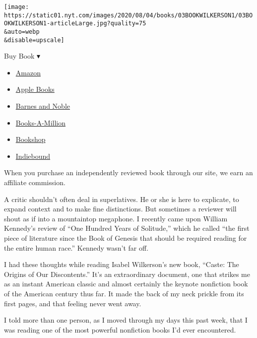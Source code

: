 \texttt{[image: https://static01.nyt.com/images/2020/08/04/books/03BOOKWILKERSON1/03BOOKWILKERSON1-articleLarge.jpg?quality=75\\\&auto=webp\\\&disable=upscale]}

Buy Book ▾

\begin{itemize}
\tightlist
\item
  \href{https://www.amazon.com/gp/search?index=books\&tag=NYTBSREV-20\&field-keywords=Caste+Isabel+Wilkerson}{Amazon}
\item
  \href{https://du-gae-books-dot-nyt-du-prd.appspot.com/buy?title=Caste\&author=Isabel+Wilkerson}{Apple
  Books}
\item
  \href{https://www.anrdoezrs.net/click-7990613-11819508?url=https\%3A\%2F\%2Fwww.barnesandnoble.com\%2Fw\%2F\%3Fean\%3D9780593230251}{Barnes
  and Noble}
\item
  \href{https://www.anrdoezrs.net/click-7990613-35140?url=https\%3A\%2F\%2Fwww.booksamillion.com\%2Fp\%2FCaste\%2FIsabel\%2BWilkerson\%2F9780593230251}{Books-A-Million}
\item
  \href{https://bookshop.org/a/3546/9780593230251}{Bookshop}
\item
  \href{https://www.indiebound.org/book/9780593230251?aff=NYT}{Indiebound}
\end{itemize}

When you purchase an independently reviewed book through our site, we
earn an affiliate commission.

A critic shouldn't often deal in superlatives. He or she is here to
explicate, to expand context and to make fine distinctions. But
sometimes a reviewer will shout as if into a mountaintop megaphone. I
recently came upon William Kennedy's review of ``One Hundred Years of
Solitude,'' which he called ``the first piece of literature since the
Book of Genesis that should be required reading for the entire human
race.'' Kennedy wasn't far off.

I had these thoughts while reading Isabel Wilkerson's new book, ``Caste:
The Origins of Our Discontents.'' It's an extraordinary document, one
that strikes me as an instant American classic and almost certainly the
keynote nonfiction book of the American century thus far. It made the
back of my neck prickle from its first pages, and that feeling never
went away.

I told more than one person, as I moved through my days this past week,
that I was reading one of the most powerful nonfiction books I'd ever
encountered.

